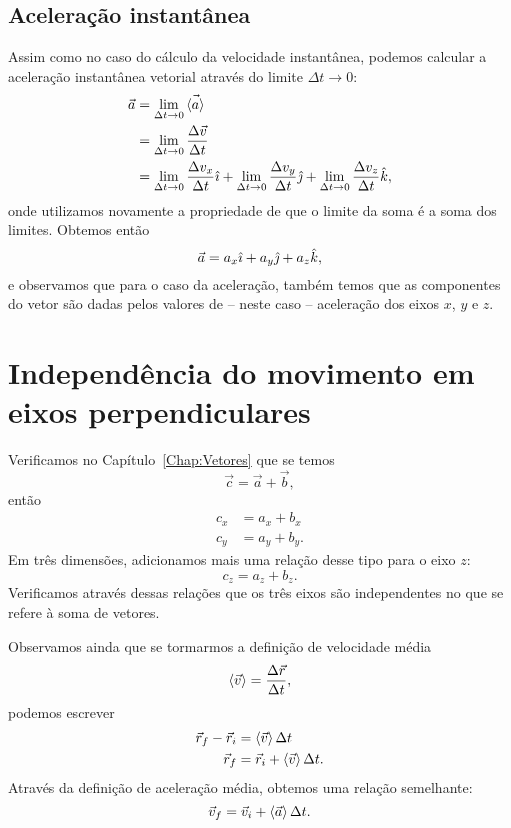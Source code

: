 \subsection{Aceleração instantânea}

Assim como no caso do cálculo da velocidade instantânea, podemos calcular a aceleração instantânea vetorial através do limite $\Delta t \to 0$:
\begin{align}
  \vec{a} &= \lim_{\Delta t \to 0} \vec{\left\langle{a}\right\rangle} \\
  &= \lim_{\Delta t \to 0} \frac{\Delta \vec{v}}{\Delta t} \\
  &= \lim_{\Delta t \to 0} \frac{\Delta {v_x}}{\Delta t}\hat{\imath} + \lim_{\Delta t \to 0} \frac{\Delta {v_y}}{\Delta t}\hat{\jmath} + \lim_{\Delta t \to 0} \frac{\Delta {v_z}}{\Delta t}\hat{k},
\end{align}
%
onde utilizamos novamente a propriedade de que o limite da soma é a soma dos limites. Obtemos então
\begin{equation}
  \vec{a} = a_x \hat{\imath} + a_y \hat{\jmath} + a_z \hat{k},
\end{equation}
%
e observamos que para o caso da aceleração, também temos que as componentes do vetor são dadas pelos valores de -- neste caso -- aceleração dos eixos $x$, $y$ e $z$.

\section{Independência do movimento em eixos perpendiculares}

Verificamos no Capítulo~\ref{Chap:Vetores} que se temos
\begin{equation}
    \vec{c} = \vec{a} + \vec{b},
\end{equation}
%
então
\begin{align}
    c_x &= a_x + b_x \\
    c_y &= a_y + b_y.
\end{align}
%
Em três dimensões, adicionamos mais uma relação desse tipo para o eixo $z$:
\begin{equation}
    c_z = a_z + b_z.
\end{equation}
%
Verificamos através dessas relações que os três eixos são independentes no que se refere à soma de vetores.

Observamos ainda que se tormarmos a definição de velocidade média
\begin{equation}
    \left\langle{\vec{v}}\right\rangle = \frac{\Delta \vec{r}}{\Delta t},
\end{equation}
%
podemos escrever
\begin{align}
    \vec{r}_f - \vec{r}_i &= \left\langle{\vec{v}}\right\rangle \Delta t \\
    \vec{r}_f &= \vec{r}_i + \left\langle{\vec{v}}\right\rangle \Delta t.
\end{align}
%
Através da definição de aceleração média, obtemos uma relação semelhante:
\begin{equation}
    \vec{v}_f = \vec{v}_i + \left\langle{\vec{a}}\right\rangle \Delta t.
\end{equation}

